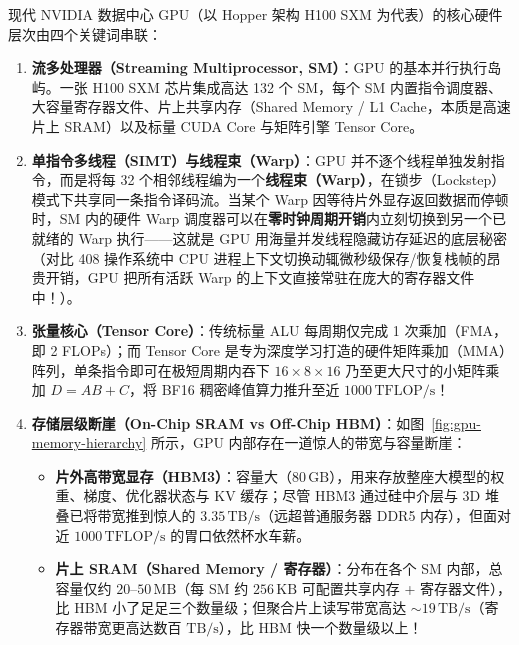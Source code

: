现代 NVIDIA 数据中心 GPU（以 Hopper 架构 H100 SXM 为代表）的核心硬件层次由四个关键词串联：
\begin{enumerate}
  \item \textbf{流多处理器（Streaming Multiprocessor, SM）}：GPU 的基本并行执行岛屿。一张 H100 SXM 芯片集成高达 132 个 SM，每个 SM 内置指令调度器、大容量寄存器文件、片上共享内存（Shared Memory / L1 Cache，本质是高速片上 SRAM）以及标量 CUDA Core 与矩阵引擎 Tensor Core。
  \item \textbf{单指令多线程（SIMT）与线程束（Warp）}：GPU 并不逐个线程单独发射指令，而是将每 32 个相邻线程编为一个\textbf{线程束（Warp）}，在锁步（Lockstep）模式下共享同一条指令译码流。当某个 Warp 因等待片外显存返回数据而停顿时，SM 内的硬件 Warp 调度器可以在\textbf{零时钟周期开销}内立刻切换到另一个已就绪的 Warp 执行——这就是 GPU 用海量并发线程隐藏访存延迟的底层秘密（对比 408 操作系统中 CPU 进程上下文切换动辄微秒级保存/恢复栈帧的昂贵开销，GPU 把所有活跃 Warp 的上下文直接常驻在庞大的寄存器文件中！）。
  \item \textbf{张量核心（Tensor Core）}：传统标量 ALU 每周期仅完成 1 次乘加（FMA，即 2 FLOPs）；而 Tensor Core 是专为深度学习打造的硬件矩阵乘加（MMA）阵列，单条指令即可在极短周期内吞下 $16\times 8\times 16$ 乃至更大尺寸的小矩阵乘加 $D = A B + C$，将 BF16 稠密峰值算力推升至近 $1000\,\mathrm{TFLOP/s}$！
  \item \textbf{存储层级断崖（On-Chip SRAM vs Off-Chip HBM）}：如图~\ref{fig:gpu-memory-hierarchy} 所示，GPU 内部存在一道惊人的带宽与容量断崖：
  \begin{itemize}
    \item \textbf{片外高带宽显存（HBM3）}：容量大（$80\,\mathrm{GB}$），用来存放整座大模型的权重、梯度、优化器状态与 KV 缓存；尽管 HBM3 通过硅中介层与 3D 堆叠已将带宽推到惊人的 $3.35\,\mathrm{TB/s}$（远超普通服务器 DDR5 内存），但面对近 $1000\,\mathrm{TFLOP/s}$ 的胃口依然杯水车薪。
    \item \textbf{片上 SRAM（Shared Memory / 寄存器）}：分布在各个 SM 内部，总容量仅约 $20\text{--}50\,\mathrm{MB}$（每 SM 约 $256\,\mathrm{KB}$ 可配置共享内存 + 寄存器文件），比 HBM 小了足足三个数量级；但聚合片上读写带宽高达 $\sim 19\,\mathrm{TB/s}$（寄存器带宽更高达数百 $\mathrm{TB/s}$），比 HBM 快一个数量级以上！
  \end{itemize}
\end{enumerate}

